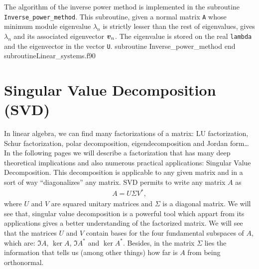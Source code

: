      
     The algorithm of the inverse power method is implemented in the subroutine \verb|Inverse_power_method|. This subroutine, given a normal matrix \verb|A| whose minimum module eigenvalue $\lambda_n$ is strictly lesser than the rest of eigenvalues, gives $\lambda_n$ and its associated eigenvector $\boldsymbol{v}_n$. The eigenvalue is stored on the real \verb|lambda| and the eigenvector in the vector \verb|U|.
     \vspace{0.5cm} 
     {subroutine Inverse_power_method}
     {end subroutine}{Linear_systems.f90}
     
  
  
  
  
  
  \newpage 
   \section{Singular Value Decomposition (SVD)}
   
   In linear algebra, we can find many factorizations of a matrix: LU factorization, Schur factorization, polar decomposition, 
   eigendecomposition and Jordan form\ldots In the following pages we will describe a factorization that has many deep theoretical 
   implications and also numerous practical applications: Singular Value Decomposition. 
   This decomposition is applicable to any given matrix 
   and in a sort of way ``diagonalizes'' any matrix. SVD permits to write any matrix $A$ as
   \begin{align*}
   	A = U \Sigma V^*,
   \end{align*}
   where $U$ and $V$ are squared unitary matrices and $\Sigma$ is a diagonal matrix. We will see that, singular value decomposition is a 
   powerful tool which appart from its applications gives a better understanding of the factorized matrix. We will see that the matrices $U$ 
   and $V$ contain bases for the four fundamental subspaces of $A$, which are: $\Im A$, $\ker A$, $\Im A^*$ and $\ker A^*$. Besides, in the 
   matrix $\Sigma$ lies the information that tells us (among other things) how far is $A$ from being orthonormal. 
